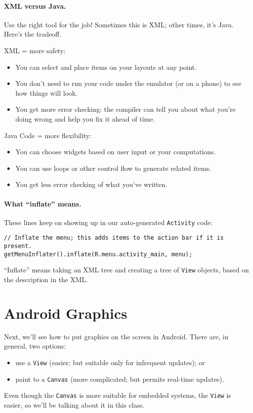 \paragraph{XML versus Java.}
Use the right tool for the job! Sometimes this is XML; other times,
it's Java. Here's the tradeoff.

XML = more safety:
\begin{itemize}
\item You can select and place items on your layouts at any point.
\item You don't need to run your code under the emulator (or on a
  phone) to see how things will look.
\item You get more error checking: the compiler can tell you about
what you're doing wrong and help you fix it ahead of time.
\end{itemize}

Java Code = more flexibility:
\begin{itemize}
\item You can choose widgets based on user input or your computations.
\item You can use loops or other control flow to generate related items.
\item You get less error checking of what you've written.
\end{itemize}

\paragraph{What ``inflate'' means.}
These lines keep on showing up in our auto-generated {\tt Activity} code:
{\tiny
\begin{lstlisting}
// Inflate the menu; this adds items to the action bar if it is present.
getMenuInflater().inflate(R.menu.activity_main, menu);
\end{lstlisting}
}

``Inflate'' means taking an XML tree and creating a tree of {\tt View}
objects, based on the description in the XML.

\newpage
\section*{Android Graphics}
Next, we'll see how to put graphics on the screen in Android. 
There are, in general, two options:
\begin{itemize}
\item use a {\tt View} (easier; but suitable only for infrequent updates); or
\item paint to a {\tt Canvas} (more complicated; but permits real-time updates).
\end{itemize}
Even though the {\tt Canvas} is more suitable for embedded systems, 
the {\tt View} is easier, so we'll be talking about it in this class.

